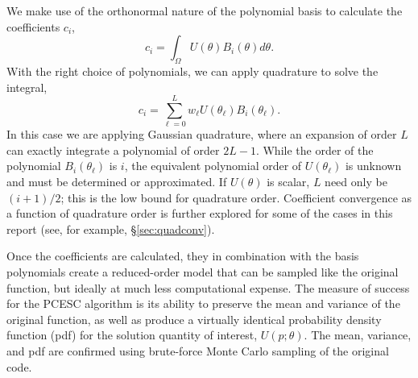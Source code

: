 \documentclass[11pt]{article} %
\begin{document}
We make use of the orthonormal nature of the polynomial basis to calculate the coefficients $c_i$,
\begin{equation}
c_i = \int_\Omega U(\theta)B_i(\theta)d\theta.
\end{equation}
With the right choice of polynomials, we can apply quadrature to solve the integral,
\begin{equation}
c_i = \sum_{\ell=0}^{L} w_\ell U(\theta_\ell) B_i(\theta_\ell).
\end{equation}
In this case we are applying Gaussian quadrature, where an expansion of order $L$ can exactly integrate a polynomial of order $2L-1$.  While the order of the polynomial $B_i(\theta_\ell)$ is $i$, the equivalent polynomial order of $U(\theta_\ell)$ is unknown and must be determined or approximated.  If $U(\theta)$ is scalar, $L$ need only be $(i+1)/2$; this is the low bound for quadrature order.  Coefficient convergence as a function of quadrature order is further explored for some of the cases in this report (see, for example, \S \ref{sec:quadconv}).

Once the coefficients are calculated, they in combination with the basis polynomials create a reduced-order model that can be sampled like the original function, but ideally at much less computational expense.  The measure of success for the PCESC algorithm is its ability to preserve the mean and variance of the original function, as well as produce a virtually identical probability density function (pdf) for the solution quantity of interest, $U(p;\theta)$.  The mean, variance, and pdf are confirmed using brute-force Monte Carlo sampling of the original code.





\end{document}
